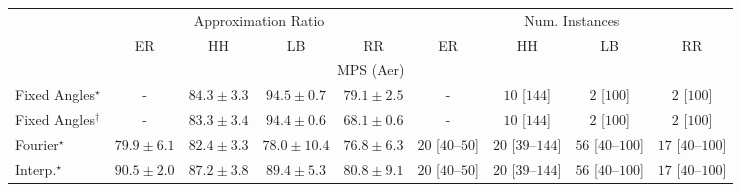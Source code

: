 \begin{tabular}{l|cccc|cccc|}
\toprule
& \multicolumn{4}{c|}{Approximation Ratio} & \multicolumn{4}{c|}{Num. Instances} \\
            & ER & HH & LB & RR & ER & HH & LB & RR \\
\midrule
\multicolumn{9}{c}{\rule{0pt}{8pt}MPS (Aer)} \\
\midrule
Fixed Angles$^\star$ & {\cellcolor[HTML]{000000}} \color[HTML]{F1F1F1} {\cellcolor{white}} \color{black} - & {\cellcolor[HTML]{88449E}} \color[HTML]{F1F1F1} $84.3\pm 3.3$ & {\cellcolor[HTML]{540251}} \color[HTML]{F1F1F1} $94.5\pm 0.7$ & {\cellcolor[HTML]{8C6DB2}} \color[HTML]{F1F1F1} $79.1\pm 2.5$ & {\cellcolor[HTML]{000000}} \color[HTML]{F1F1F1} {\cellcolor{white}} \color{black} - & {\cellcolor[HTML]{FFF6F2}} \color[HTML]{000000} $10$ [$144$] & {\cellcolor[HTML]{FFF7F3}} \color[HTML]{000000} $2$ [$100$] & {\cellcolor[HTML]{FFF7F3}} \color[HTML]{000000} $2$ [$100$] \\
Fixed Angles$^\dagger$ & {\cellcolor[HTML]{000000}} \color[HTML]{F1F1F1} {\cellcolor{white}} \color{black} - & {\cellcolor[HTML]{894CA2}} \color[HTML]{F1F1F1} $83.3\pm 3.4$ & {\cellcolor[HTML]{550253}} \color[HTML]{F1F1F1} $94.4\pm 0.6$ & {\cellcolor[HTML]{A2BFDB}} \color[HTML]{000000} $68.1\pm 0.6$ & {\cellcolor[HTML]{000000}} \color[HTML]{F1F1F1} {\cellcolor{white}} \color{black} - & {\cellcolor[HTML]{FFF6F2}} \color[HTML]{000000} $10$ [$144$] & {\cellcolor[HTML]{FFF7F3}} \color[HTML]{000000} $2$ [$100$] & {\cellcolor[HTML]{FFF7F3}} \color[HTML]{000000} $2$ [$100$] \\
Fourier$^\star$ & {\cellcolor[HTML]{8C66AF}} \color[HTML]{F1F1F1} $79.9\pm 6.1$ & {\cellcolor[HTML]{8A52A5}} \color[HTML]{F1F1F1} $82.4\pm 3.3$ & {\cellcolor[HTML]{8C75B6}} \color[HTML]{F1F1F1} $78.0\pm 10.4$ & {\cellcolor[HTML]{8C80BB}} \color[HTML]{F1F1F1} $76.8\pm 6.3$ & {\cellcolor[HTML]{FFF3F0}} \color[HTML]{000000} $20$ [$40$--$50$] & {\cellcolor[HTML]{FFF3F0}} \color[HTML]{000000} $20$ [$39$--$144$] & {\cellcolor[HTML]{FEEBE7}} \color[HTML]{000000} $56$ [$40$--$100$] & {\cellcolor[HTML]{FFF4F0}} \color[HTML]{000000} $17$ [$40$--$100$] \\
Interp.$^\star$ & {\cellcolor[HTML]{7B0D76}} \color[HTML]{F1F1F1} $90.5\pm 2.0$ & {\cellcolor[HTML]{85288D}} \color[HTML]{F1F1F1} $87.2\pm 3.8$ & {\cellcolor[HTML]{82147F}} \color[HTML]{F1F1F1} $89.4\pm 5.3$ & {\cellcolor[HTML]{8B60AC}} \color[HTML]{F1F1F1} $80.8\pm 9.1$ & {\cellcolor[HTML]{FFF3F0}} \color[HTML]{000000} $20$ [$40$--$50$] & {\cellcolor[HTML]{FFF3F0}} \color[HTML]{000000} $20$ [$39$--$144$] & {\cellcolor[HTML]{FEEBE7}} \color[HTML]{000000} $56$ [$40$--$100$] & {\cellcolor[HTML]{FFF4F0}} \color[HTML]{000000} $17$ [$40$--$100$] \\

\end{tabular}
